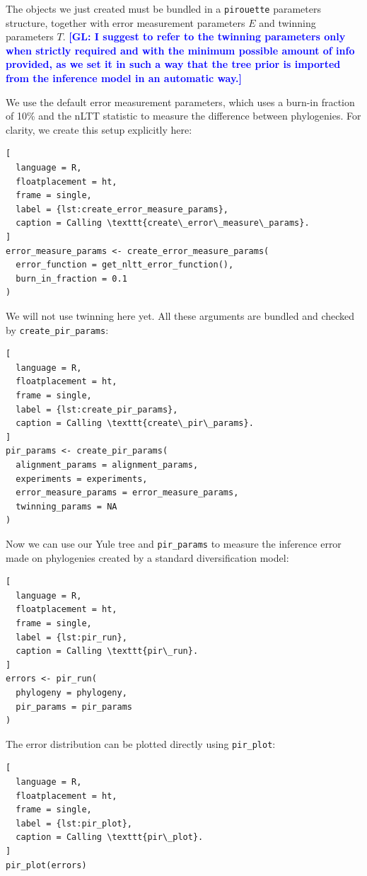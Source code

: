 \documentclass{article}
\newcommand{\giovanni}[1]{\textcolor{blue}{\textbf{[GL: #1]}}}
\begin{document}
The objects we just created must be bundled
in a \verb;pirouette; parameters structure,
together with error measurement parameters $\mathit{E}$ and
twinning parameters $\mathit{T}$. \giovanni{I suggest to refer to the twinning parameters only when strictly required and with the minimum possible amount of info provided, as we set it in such a way that the tree prior is imported from the inference model in an automatic way.}

We use the default error measurement
parameters, which uses a burn-in fraction of 10\% and the nLTT statistic to
measure the difference between phylogenies. For clarity,
we create this setup explicitly here:

\begin{lstlisting}[
  language = R,
  floatplacement = ht,
  frame = single,
  label = {lst:create_error_measure_params},
  caption = Calling \texttt{create\_error\_measure\_params}.
]
error_measure_params <- create_error_measure_params(
  error_function = get_nltt_error_function(),
  burn_in_fraction = 0.1
)
\end{lstlisting}

We will not use twinning here yet.  
All these arguments are bundled
and checked by \verb;create_pir_params;:

\begin{lstlisting}[
  language = R,
  floatplacement = ht,
  frame = single,
  label = {lst:create_pir_params},
  caption = Calling \texttt{create\_pir\_params}.
]
pir_params <- create_pir_params(
  alignment_params = alignment_params,
  experiments = experiments,
  error_measure_params = error_measure_params,
  twinning_params = NA
)
\end{lstlisting}

Now we can use our Yule tree and \verb;pir_params; to measure 
the inference error made on phylogenies
created by a standard diversification model:

\begin{lstlisting}[
  language = R,
  floatplacement = ht,
  frame = single,
  label = {lst:pir_run},
  caption = Calling \texttt{pir\_run}.
]
errors <- pir_run(
  phylogeny = phylogeny,
  pir_params = pir_params
)
\end{lstlisting}

The error distribution can be plotted directly using \verb;pir_plot;:

\begin{lstlisting}[
  language = R,
  floatplacement = ht,
  frame = single,
  label = {lst:pir_plot},
  caption = Calling \texttt{pir\_plot}.
]
pir_plot(errors)
\end{lstlisting}
\end{document}
